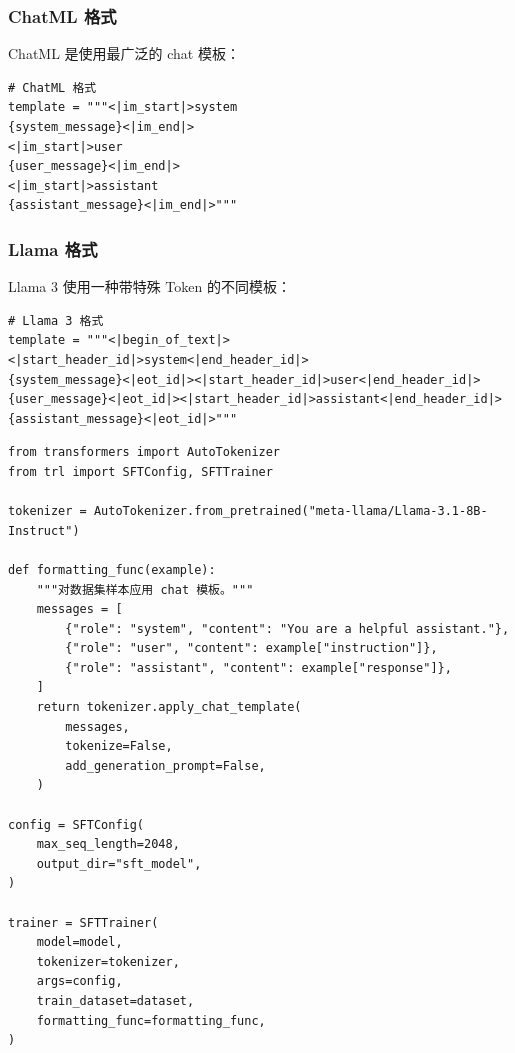 \subsubsection*{ChatML 格式}
\label{chatml-format}

ChatML 是使用最广泛的 chat 模板：

\begin{lstlisting}[style=pythonstyle]
# ChatML 格式
template = """<|im_start|>system
{system_message}<|im_end|>
<|im_start|>user
{user_message}<|im_end|>
<|im_start|>assistant
{assistant_message}<|im_end|>"""
\end{lstlisting}

\subsubsection*{Llama 格式}
\label{llama-format}

Llama 3 使用一种带特殊 Token 的不同模板：

\begin{lstlisting}[style=pythonstyle]
# Llama 3 格式
template = """<|begin_of_text|><|start_header_id|>system<|end_header_id|>
{system_message}<|eot_id|><|start_header_id|>user<|end_header_id|>
{user_message}<|eot_id|><|start_header_id|>assistant<|end_header_id|>
{assistant_message}<|eot_id|>"""
\end{lstlisting}

\begin{examplebox}
\begin{lstlisting}[style=pythonstyle]
from transformers import AutoTokenizer
from trl import SFTConfig, SFTTrainer

tokenizer = AutoTokenizer.from_pretrained("meta-llama/Llama-3.1-8B-Instruct")

def formatting_func(example):
    """对数据集样本应用 chat 模板。"""
    messages = [
        {"role": "system", "content": "You are a helpful assistant."},
        {"role": "user", "content": example["instruction"]},
        {"role": "assistant", "content": example["response"]},
    ]
    return tokenizer.apply_chat_template(
        messages,
        tokenize=False,
        add_generation_prompt=False,
    )

config = SFTConfig(
    max_seq_length=2048,
    output_dir="sft_model",
)

trainer = SFTTrainer(
    model=model,
    tokenizer=tokenizer,
    args=config,
    train_dataset=dataset,
    formatting_func=formatting_func,
)
\end{lstlisting}
\end{examplebox}

